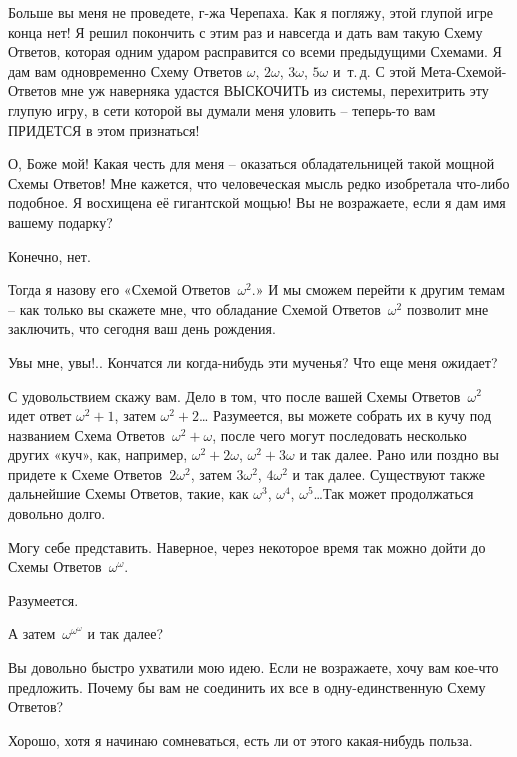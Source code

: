\documentclass[../main.tex]{subfiles}
\begin{document}
\begin{dialogue}
 Больше вы меня не проведете, г-жа Черепаха. Как я погляжу, этой глупой игре конца нет! Я решил покончить с этим раз и навсегда и дать вам такую Схему Ответов, которая одним ударом расправится со всеми предыдущими Схемами. Я дам вам одновременно Схему Ответов $\omega$, $2\omega$, $3\omega$, $5\omega$ и~т.\,д. С этой Мета-Схемой-Ответов мне уж наверняка удастся ВЫСКОЧИТЬ из системы, перехитрить эту глупую игру, в сети которой вы думали меня уловить \--- теперь-то вам ПРИДЕТСЯ в этом признаться!

 О, Боже мой! Какая честь для меня \--- оказаться обладательницей такой мощной Схемы Ответов! Мне кажется, что человеческая мысль редко изобретала что-либо подобное. Я восхищена её гигантской мощью! Вы не возражаете, если я дам имя вашему подарку?

 Конечно, нет.

 Тогда я назову его «Схемой Ответов~$\omega^2$.» И мы сможем перейти к другим темам \--- как только вы скажете мне, что обладание Схемой Ответов~$\omega^2$ позволит мне заключить, что сегодня ваш день рождения.

 Увы мне, увы!.. Кончатся ли когда-нибудь эти мученья? Что еще меня ожидает?

 С удовольствием скажу вам. Дело в том, что после вашей Схемы Ответов~$\omega^2$ идет ответ $\omega^2 + 1$, затем $\omega^2 + 2$\ldots{} Разумеется, вы можете собрать их в кучу под названием Схема Ответов~$\omega^2 + \omega$, после чего могут последовать несколько других «куч», как, например, $\omega^2 + 2\omega$, $\omega^2 + 3\omega$ и так далее. Рано или поздно вы придете к Схеме Ответов~$2\omega^2$, затем $3\omega^2$, $4\omega^2$ и так далее. Существуют также дальнейшие Схемы Ответов, такие, как $\omega^3$, $\omega^4$, $\omega^5$\ldots Так может продолжаться довольно долго.

 Могу себе представить. Наверное, через некоторое время так можно дойти до Схемы Ответов~$\omega^\omega$.

 Разумеется.

 А затем~$\omega^{\omega^\omega}$ и так далее?

 Вы довольно быстро ухватили мою идею. Если не возражаете, хочу вам кое-что предложить. Почему бы вам не соединить их все в одну-единственную Схему Ответов?

 Хорошо, хотя я начинаю сомневаться, есть ли от этого какая-нибудь польза.


\end{dialogue}
\end{document}
